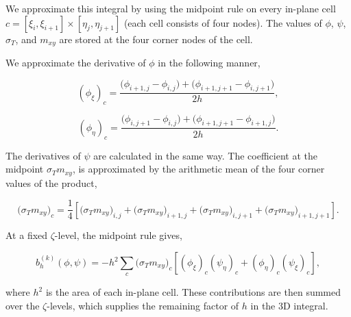 \documentclass[final-report]{report-template}
\begin{document}
We approximate this integral by using the midpoint rule on every in-plane cell $c=[\xi_i,\xi_{i+1}]\times[\eta_j,\eta_{j+1}]$ (each cell consists of four nodes). The values of $\phi$, $\psi$, $\sigma_T$, and $m_{xy}$ are stored at the four corner nodes of the cell.

We approximate the derivative of $\phi$ in the following manner,

$$
(\phi_\xi)_c = \frac{\big(\phi_{i+1,j} - \phi_{i,j}\big) + \big(\phi_{i+1,j+1}-\phi_{i,j+1}\big)}{2h},
$$

$$
(\phi_\eta)_c = \frac{\big(\phi_{i,j+1}-\phi_{i,j}\big) + \big(\phi_{i+1,j+1}-\phi_{i+1,j}\big)}{2h}.
$$

The derivatives of $\psi$ are calculated in the same way. The coefficient at the midpoint $\sigma_Tm_{xy}$, is approximated by the arithmetic mean of the four corner values of the product,

$$
\big(\sigma_Tm_{xy}\big)_c
=
\frac14\left[
\big(\sigma_Tm_{xy}\big)_{i,j}
+\big(\sigma_Tm_{xy}\big)_{i+1,j}
+\big(\sigma_Tm_{xy}\big)_{i,j+1}
+\big(\sigma_Tm_{xy}\big)_{i+1,j+1}
\right].
$$

At a fixed \(\zeta\)-level, the midpoint rule gives,

$$
b_h^{(k)}(\phi,\psi) = -h^2\sum_c \big(\sigma_Tm_{xy}\big)_c \left[ (\phi_\xi)_c(\psi_\eta)_c + (\phi_\eta)_c(\psi_\xi)_c \right],
$$

where \(h^2\) is the area of each in-plane cell. These contributions are then summed over the \(\zeta\)-levels, which supplies the remaining factor of $h$ in the 3D integral.

\end{document}
